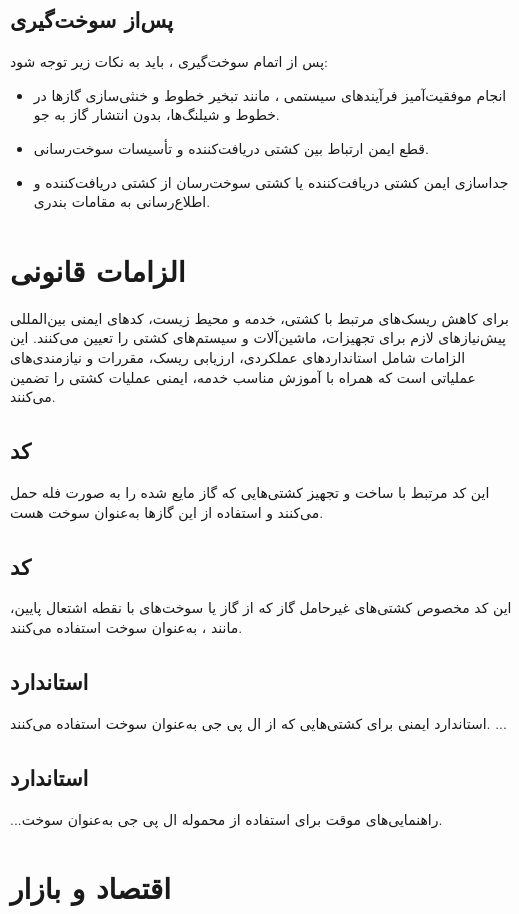 \subsection{پس‌از سوخت‌گیری}
پس از اتمام سوخت‌گیری
، باید به نکات زیر توجه شود:
\begin{itemize}
	\item انجام موفقیت‌آمیز فرآیندهای سیستمی ، مانند تبخیر خطوط و خنثی‌سازی گازها در خطوط و شیلنگ‌ها، بدون انتشار گاز به جو.
	\item قطع ایمن ارتباط بین کشتی دریافت‌کننده و تأسیسات سوخت‌رسانی.
	\item جداسازی ایمن کشتی دریافت‌کننده یا کشتی سوخت‌رسان از کشتی دریافت‌کننده و اطلاع‌رسانی به مقامات بندری.
\end{itemize}

\section{الزامات قانونی}
برای کاهش ریسک‌های مرتبط با کشتی، خدمه و محیط زیست، کدهای ایمنی بین‌المللی پیش‌نیازهای لازم برای تجهیزات، ماشین‌آلات و سیستم‌های کشتی را تعیین می‌کنند. این الزامات شامل استانداردهای عملکردی، ارزیابی ریسک، مقررات و نیازمندی‌های عملیاتی است که همراه با آموزش مناسب خدمه، ایمنی عملیات کشتی را تضمین می‌کنند.
\subsection{کد }
این کد مرتبط با ساخت و تجهیز کشتی‌هایی که گاز مایع شده را به صورت فله حمل می‌کنند و استفاده از این گازها به‌عنوان سوخت هست.
\subsection{کد }
این کد مخصوص کشتی‌های غیرحامل گاز که از گاز یا سوخت‌های با نقطه اشتعال پایین، مانند
،
به‌عنوان سوخت استفاده می‌کنند.	

\subsection{استاندارد }
استاندارد ایمنی برای کشتی‌هایی که از ال پی جی به‌عنوان سوخت استفاده می‌کنند.
...
\subsection{استاندارد }
...راهنمایی‌های موقت برای استفاده از محموله ال پی جی به‌عنوان سوخت.


\section{اقتصاد و بازار }
